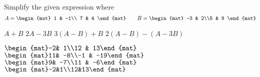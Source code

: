 
\begin{Exercise}[
name={},
title={}, 
difficulty=0,
origin={\cite{GH}}]
Simplify the given expression where
\begin{equation*}
A=\begin{mat}
1 & -1\\ 7 & 4
\end{mat}\qquad
B=\begin{mat}
-3 & 2\\5 & 9
\end{mat}
\end{equation*}
\begin{multicols}{2}
\Question $A+B$ 
\Question $2A-3B$
\Question $3(A - B)+B$
\Question $2(A - B)-(A - 3B)$ 
\EndCurrentQuestion
\end{multicols}

\end{Exercise}

\begin{Answer}
\Question $\begin{mat}-2& 1\\12 & 13\end{mat}$
\Question $\begin{mat}11& -8\\-1 & -19\end{mat}$
\Question $\begin{mat}9& -7\\11 & -6\end{mat}$
\Question $\begin{mat}-2&1\\12&13\end{mat}$
\end{Answer}
